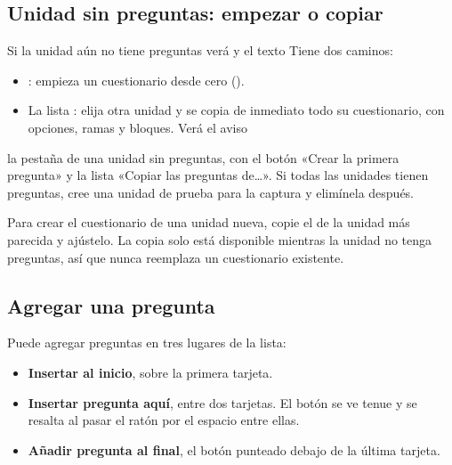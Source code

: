 \subsection{Unidad sin preguntas: empezar o copiar}\label{sec:copiar-arbol}

Si la unidad aún no tiene preguntas verá  y el
texto  Tiene dos caminos:

\begin{itemize}
  \item {}: empieza un cuestionario desde cero
        ().
  \item La lista : elija otra unidad y se copia de inmediato
        todo su cuestionario, con opciones, ramas y bloques. Verá el aviso
\end{itemize}

  {la pestaña de una unidad sin preguntas, con el botón «Crear la primera pregunta» y la lista
   «Copiar las preguntas de…». Si todas las unidades tienen preguntas, cree una unidad de
   prueba para la captura y elimínela después.}

\begin{consejo}
Para crear el cuestionario de una unidad nueva, copie el de la unidad más parecida y ajústelo.
La copia solo está disponible mientras la unidad no tenga preguntas, así que nunca reemplaza un
cuestionario existente.
\end{consejo}

\subsection{Agregar una pregunta}\label{sec:agregar-pregunta}

Puede agregar preguntas en tres lugares de la lista:

\begin{itemize}
  \item \textbf{Insertar al inicio}, sobre la primera tarjeta.
  \item \textbf{Insertar pregunta aquí}, entre dos tarjetas. El botón se ve tenue y se resalta al
        pasar el ratón por el espacio entre ellas.
  \item \textbf{Añadir pregunta al final}, el botón punteado debajo de la última tarjeta.
\end{itemize}

